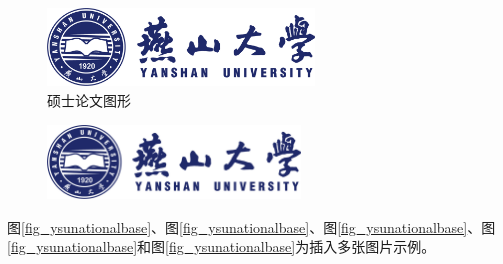 \documentclass[master,academic]{ysuthesis} %
\begin{document}
			\begin{figure}[!ht]
				\centering
				\includegraphics[width=2.79in]{ysu_logo}
				\caption{硕士论文图形}
				\label{fig:ysu_logo}
			\end{figure}
			\begin{figure}[!ht]
				\centering
				\includegraphics[width=0.6\textwidth]{ysu_logo}
				\label{ysulogo}
            \end{figure}


		图\ref{fig_ysunationalbase}、图\ref{fig_ysunationalbase}、图\ref{fig_ysunationalbase}、图\ref{fig_ysunationalbase}和图\ref{fig_ysunationalbase}为插入多张图片示例。
\end{document}

